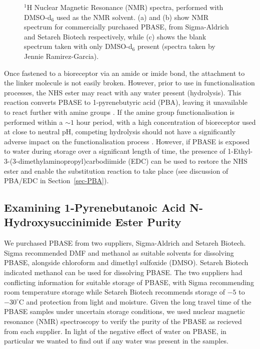 \documentclass[
  a4paper,
]{scrbook}
\begin{document}
\begin{figure}
\begin{minipage}[t]{\linewidth}
{{}

}

\subcaption{\label{fig-dmso-nmr}}
\end{minipage}%

\caption{\label{fig-pbase-nmr}\(^{1}\)H Nuclear Magnetic Resonance (NMR)
spectra, performed with DMSO-d\(_6\) used as the NMR solvent. (a) and
(b) show NMR spectrum for commercially purchased PBASE, from
Sigma-Aldrich and Setareh Biotech respectively, while (c) shows the
blank spectrum taken with only DMSO-d\(_6\) present (spectra taken by
Jennie Ramirez-Garcia).}

\end{figure}

Once fastened to a bioreceptor via an amide or imide bond, the
attachment to the linker molecule is not easily broken. However, prior
to use in functionalisation processes, the NHS ester may react with any
water present (hydrolysis). This reaction converts PBASE to
1-pyrenebutyric acid (PBA), leaving it unavailable to react further with
amine groups \autocite{Hermanson2013-3,Hermanson2013-5,Mishyn2022}. If
the amine group functionalisation is performed within a \(\sim1\) hour
period, with a high concentration of bioreceptor used at close to
neutral pH, competing hydrolysis should not have a significantly adverse
impact on the functionalisation process \autocite{Hermanson2013-3}.
However, if PBASE is exposed to water during storage over a significant
length of time, the presence of
1-Ethyl-3-(3-dimethylaminopropyl)carbodiimide (EDC) can be used to
restore the NHS ester and enable the substitution reaction to take place
(see discussion of PBA/EDC in Section~\ref{sec-PBA}).

\hypertarget{examining-1-pyrenebutanoic-acid-n-hydroxysuccinimide-ester-purity}{%
\subsection{Examining 1-Pyrenebutanoic Acid N-Hydroxysuccinimide Ester
Purity}\label{examining-1-pyrenebutanoic-acid-n-hydroxysuccinimide-ester-purity}}

We purchased PBASE from two suppliers, Sigma-Aldrich and Setareh
Biotech. Sigma recommended DMF and methanol as suitable solvents for
dissolving PBASE, alongside chloroform and dimethyl sulfoxide (DMSO).
Setareh Biotech indicated methanol can be used for dissolving PBASE. The
two suppliers had conflicting information for suitable storage of PBASE,
with Sigma recommending room temperature storage while Setareh Biotech
recommends storage of \(-5\) to \(-30 ^\circ \text{C}\) and protection
from light and moisture. Given the long travel time of the PBASE samples
under uncertain storage conditions, we used nuclear magnetic resonance
(NMR) spectroscopy to verify the purity of the PBASE as recieved from
each supplier. In light of the negative effect of water on PBASE, in
particular we wanted to find out if any water was present in the
samples.
\end{document}
